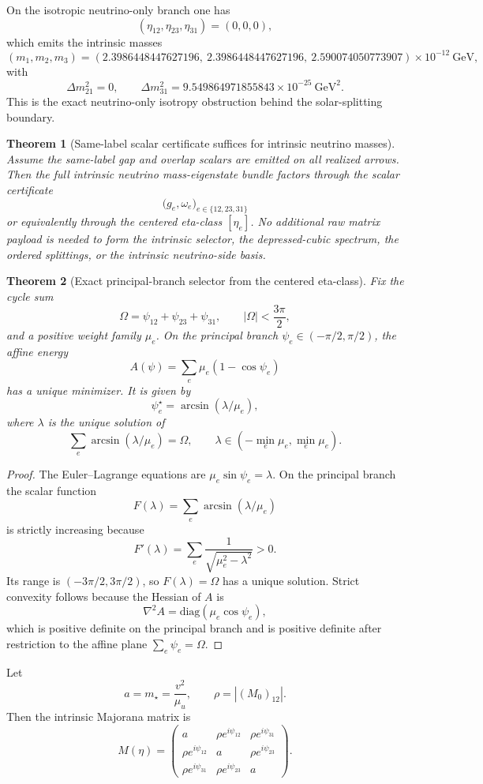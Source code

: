 \documentclass[11pt]{article}
\newtheorem{theorem}{Theorem}[section]
\begin{document}
On the isotropic neutrino-only branch one has
\[
(\eta_{12},\eta_{23},\eta_{31})=(0,0,0),
\]
which emits the intrinsic masses
\[
(m_1,m_2,m_3)=
(2.3986448447627196,\ 2.3986448447627196,\ 2.590074050773907)\times10^{-12}\ \mathrm{GeV},
\]
with
\[
\Delta m_{21}^2=0,
\qquad
\Delta m_{31}^2=9.549864971855843\times10^{-25}\ \mathrm{GeV}^2.
\]
This is the exact neutrino-only isotropy obstruction behind the solar-splitting boundary.

\begin{theorem}[Same-label scalar certificate suffices for intrinsic neutrino masses]
Assume the same-label gap and overlap scalars are emitted on all realized arrows. Then the full
intrinsic neutrino mass-eigenstate bundle factors through the scalar certificate
\[
\bigl(g_e,\omega_e\bigr)_{e\in\{12,23,31\}}
\]
or equivalently through the centered eta-class \([\eta_e]\). No additional raw matrix payload is
needed to form the intrinsic selector, the depressed-cubic spectrum, the ordered splittings, or
the intrinsic neutrino-side basis.
\end{theorem}

\begin{theorem}[Exact principal-branch selector from the centered eta-class]
Fix the cycle sum
\[
\Omega=\psi_{12}+\psi_{23}+\psi_{31},
\qquad |\Omega|<\frac{3\pi}{2},
\]
and a positive weight family \(\mu_e\). On the principal branch
\(\psi_e\in(-\pi/2,\pi/2)\), the affine energy
\[
A(\psi)=\sum_e \mu_e(1-\cos\psi_e)
\]
has a unique minimizer. It is given by
\[
\psi_e^\star=\arcsin(\lambda/\mu_e),
\]
where \(\lambda\) is the unique solution of
\[
\sum_e \arcsin(\lambda/\mu_e)=\Omega,
\qquad
\lambda\in(-\min_e\mu_e,\min_e\mu_e).
\]
\end{theorem}

\begin{proof}
The Euler--Lagrange equations are \(\mu_e\sin\psi_e=\lambda\). On the principal branch the scalar
function
\[
F(\lambda)=\sum_e\arcsin(\lambda/\mu_e)
\]
is strictly increasing because
\[
F'(\lambda)=\sum_e\frac{1}{\sqrt{\mu_e^2-\lambda^2}}>0.
\]
Its range is \((-3\pi/2,3\pi/2)\), so \(F(\lambda)=\Omega\) has a unique solution. Strict
convexity follows because the Hessian of \(A\) is
\[
\nabla^2A=\mathrm{diag}(\mu_e\cos\psi_e),
\]
which is positive definite on the principal branch and is positive definite after
restriction to the affine plane \(\sum_e\psi_e=\Omega\).
\end{proof}

Let
\[
a=m_\star=\frac{v^2}{\mu_u},
\qquad
\rho = |(M_0)_{12}|.
\]
Then the intrinsic Majorana matrix is
\[
M(\eta)=
\begin{pmatrix}
a & \rho e^{i\psi_{12}} & \rho e^{i\psi_{31}}\\
\rho e^{i\psi_{12}} & a & \rho e^{i\psi_{23}}\\
\rho e^{i\psi_{31}} & \rho e^{i\psi_{23}} & a
\end{pmatrix}.
\]
\end{document}

